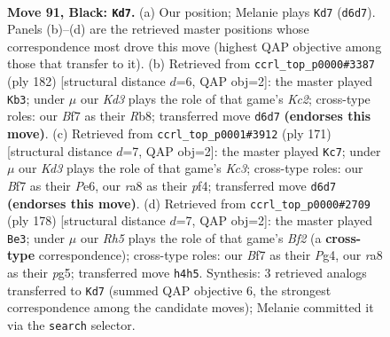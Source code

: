 \documentclass[11pt]{article}
\begin{document}
\clearpage

\begin{figure}[p]\centering
\begin{subfigure}{0.46\textwidth}\centering
\resizebox{\linewidth}{!}{%
\newchessgame
\chessboard[
  setfen={R7/5b2/1P1k4/6R1/7r/5K2/8/8 b - - 2 91},
  showmover=false,
  pgfstyle=straightmove, color=movearrow, markmove={d6-d7}
]}
\caption{}
\end{subfigure}\hfill
\begin{subfigure}{0.46\textwidth}\centering
\resizebox{\linewidth}{!}{%
\newchessgame
\chessboard[
  setfen={1R6/r7/3r4/8/7R/8/2K3k1/8 w - - 18 92},
  showmover=false,
  pgfstyle=straightmove, color=movearrow, markmove={c2-b3}
]}
\caption{}
\end{subfigure}
\\[4pt]
\begin{subfigure}{0.46\textwidth}\centering
\resizebox{\linewidth}{!}{%
\newchessgame
\chessboard[
  setfen={3R4/6r1/2k1p3/8/5P2/8/2K5/8 b - - 0 86},
  showmover=false,
  pgfstyle=straightmove, color=movearrow, markmove={c6-c7}
]}
\caption{}
\end{subfigure}\hfill
\begin{subfigure}{0.46\textwidth}\centering
\resizebox{\linewidth}{!}{%
\newchessgame
\chessboard[
  setfen={8/5k2/8/6p1/4K1P1/7r/5B2/8 w - - 16 90},
  showmover=false,
  pgfstyle=straightmove, color=movearrow, markmove={f2-e3}
]}
\caption{}
\end{subfigure}
\caption{\textbf{Move 91, Black: \texttt{Kd7}.} (a) Our position; Melanie plays \texttt{Kd7} (\texttt{d6d7}). Panels (b)--(d) are the retrieved master positions whose correspondence most drove this move (highest QAP objective among those that transfer to it). (b) Retrieved from \texttt{ccrl\_top\_p0000\#3387} (ply 182) [structural distance $d$=6, QAP obj=2]: the master played \texttt{Kb3}; under $\mu$ our \emph{Kd3} plays the role of that game's \emph{Kc2}; cross-type roles: our \emph{B}f7 as their \emph{R}b8; transferred move \texttt{d6d7} \textbf{(endorses this move)}. (c) Retrieved from \texttt{ccrl\_top\_p0001\#3912} (ply 171) [structural distance $d$=7, QAP obj=2]: the master played \texttt{Kc7}; under $\mu$ our \emph{Kd3} plays the role of that game's \emph{Kc3}; cross-type roles: our \emph{B}f7 as their \emph{P}e6, our \emph{r}a8 as their \emph{p}f4; transferred move \texttt{d6d7} \textbf{(endorses this move)}. (d) Retrieved from \texttt{ccrl\_top\_p0000\#2709} (ply 178) [structural distance $d$=7, QAP obj=2]: the master played \texttt{Be3}; under $\mu$ our \emph{Rh5} plays the role of that game's \emph{Bf2} (a \textbf{cross-type} correspondence); cross-type roles: our \emph{B}f7 as their \emph{P}g4, our \emph{r}a8 as their \emph{p}g5; transferred move \texttt{h4h5}. Synthesis: 3 retrieved analogs transferred to \texttt{Kd7} (summed QAP objective 6, the strongest correspondence among the candidate moves); Melanie committed it via the \texttt{search} selector.}
\label{fig:thought-m181}
\end{figure}
\end{document}
